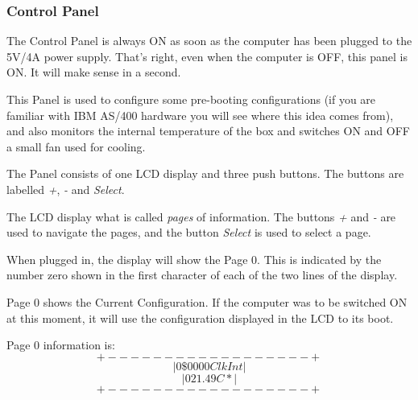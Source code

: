         \subsubsection{Control Panel}
        \label{subsubsec:controlpanel}

        The Control Panel is always ON as soon as the computer has been plugged
        to the 5V/4A power supply. That's right, even when the computer is OFF,
        this panel is ON. It will make sense in a second.
        
        This Panel is used to configure some pre-booting configurations (if you
        are familiar with IBM AS/400 hardware you will see where this idea comes
        from), and also monitors the internal temperature of the box and
        switches ON and OFF a small fan used for cooling.

        The Panel consists of one LCD display and three push buttons. The
        buttons are labelled \textit{+}, \textit{-} and \textit{Select}.

        The LCD display what is called \textit{pages} of information. The
        buttons \textit{+} and \textit{-} are used to navigate the pages, and
        the button \textit{Select} is used to select a page.
        
        When plugged in, the display will show the Page 0. This is indicated by
        the number zero shown in the first character of each of the two lines of
        the display.

        Page 0 shows the Current Configuration. If the computer was to be
        switched ON at this moment, it will use the configuration displayed in
        the LCD to its boot.

        Page 0 information is:
        \[ +------------------+ \]
        \[ |0 \$0000   Clk Int| \]
        \[ |0 21.49 C   *     | \]
        \[ +------------------+ \]


